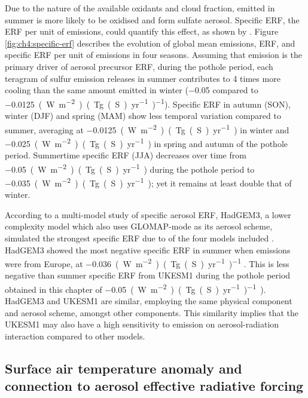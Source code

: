 Due to the nature of the available oxidants and cloud fraction,  emitted in summer is more likely to be oxidised and form sulfate aerosol. Specific ERF, the ERF per unit of  emissions, could quantify this effect, as shown by \citet{bellouinRegionalSeasonalRadiative2016}. Figure \ref{fig:ch4:specific-erf} describes the evolution of global mean  emissions, ERF, and specific ERF per unit of  emissions in four seasons. Assuming that  emission is the primary driver of aerosol precursor ERF, during the pothole period, each teragram of sulfur emission releases in summer contributes to 4 times more cooling than the same amount emitted in winter (\num{-0.05} compared to \qty{-0.0125}{(W~m^{-2})~(Tg(S)~yr^{-1})^{-1}}). Specific ERF in autumn (SON), winter (DJF) and spring (MAM) show less temporal variation compared to summer, averaging at \qty{-0.0125}{(W~m^{-2})~(Tg(S)~yr^{-1})} in winter and \qty{-0.025}{(W~m^{-2})~(Tg(S)~yr^{-1})} in spring and autumn of the pothole period. Summertime specific ERF (JJA) decreases over time from  \qty{-0.05}{(W~m^{-2})~(Tg(S)~yr^{-1})} during the pothole period to \qty{-0.035}{(W~m^{-2})~(Tg(S)~yr^{-1})}; yet it remains at least double that of winter.


According to a multi-model study of specific aerosol ERF, HadGEM3, a lower complexity model which also uses GLOMAP-mode as its aerosol scheme, simulated the strongest specific ERF due to  of the four models included \citep{bellouinRegionalSeasonalRadiative2016}. HadGEM3 showed the most negative specific ERF in summer when emissions were from Europe, at \qty{-0.036}{(W~m^{-2})~(Tg(S)~yr^{-1})^{-1}} \citep{bellouinRegionalSeasonalRadiative2016}. This is less negative than summer specific ERF from UKESM1 during the pothole period obtained in this chapter of \qty{-0.05}{(W~m^{-2})~(Tg(S)~yr^{-1})^{-1})}. HadGEM3 and UKESM1 are similar, employing the same physical component and aerosol scheme, amongst other components. This similarity implies that the UKESM1 may also have a high sensitivity to  emission on aerosol-radiation interaction compared to other models.


\subsection{Surface air temperature anomaly and connection to aerosol effective radiative forcing}
\label{ch4:sec:seasonal-tas}

